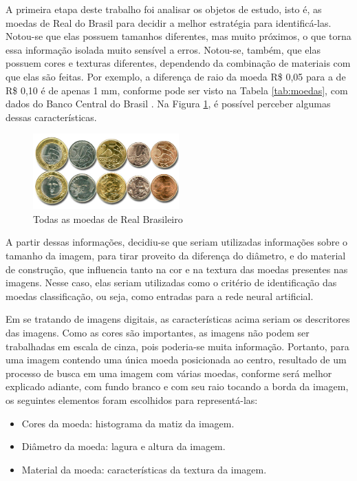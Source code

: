 \documentclass[10pt,journal,compsoc]{IEEEtran}
\begin{document}
A primeira etapa deste trabalho foi analisar os objetos de estudo, isto é, as moedas de Real do Brasil para decidir a melhor estratégia para identificá-las. Notou-se que elas possuem tamanhos diferentes, mas muito próximos, o que torna essa informação isolada muito sensível a erros. Notou-se, também, que elas possuem cores e texturas diferentes, dependendo da combinação de materiais com que elas são feitas. Por exemplo, a diferença  de raio da moeda R\$ 0,05 para a de R\$ 0,10 é de apenas 1 mm, conforme pode ser visto na Tabela \ref{tab:moedas}, com dados do Banco Central do Brasil \cite{bcb}. Na Figura \ref{fig:moedas-real}, é possível perceber algumas dessas características.


\begin{figure}[ht]
\centering
\caption{Todas as moedas de Real Brasileiro}
\label{fig:moedas-real}
\includegraphics[width=0.5\textwidth]{moedas-real.jpg}
\end{figure}


A partir dessas informações, decidiu-se que seriam utilizadas informações sobre o tamanho da imagem, para tirar proveito da diferença do diâmetro, e do material de construção, que influencia tanto na cor e na textura das moedas presentes nas imagens. Nesse caso, elas seriam utilizadas como o critério de identificação das moedas classificação, ou seja, como entradas para a rede neural artificial. 

Em se tratando de imagens digitais, as características acima seriam os descritores das imagens. Como as cores são importantes, as imagens não podem ser trabalhadas em escala de cinza, pois poderia-se muita informação. Portanto, para uma imagem contendo uma única moeda posicionada ao centro, resultado de um processo de busca em uma imagem com várias moedas, conforme será melhor explicado adiante, com fundo branco e com seu raio tocando a borda da imagem, os seguintes elementos foram escolhidos para representá-las:

\begin{itemize}  
\item Cores da moeda: histograma da matiz da imagem. 
\item Diâmetro da moeda: lagura e altura da imagem.
\item Material da moeda: características da textura da imagem.
\end{itemize}
\end{document}
